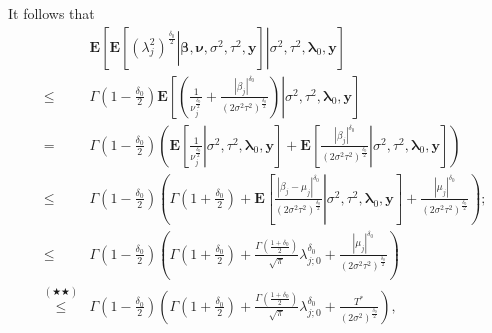 \documentclass[noinfoline,11pt]{imsart}
\numberwithin{equation}{section}
\theoremstyle{plain}
\newcommand{\bl}{\boldsymbol{\lambda}}
\newcommand{\E}{\boldsymbol{E}}
\begin{document}
It follows that 
\begin{eqnarray*}
& &    \E\left[\left.\E\left[\left.\left(\lambda_j^2\right)^{\frac{\delta_0}{2}}\right|\boldsymbol{\beta,\nu},\sigma^2,\tau^2,\mathbf{y}\right]\right|\sigma^2,\tau^2,\mathbf{\bl}_0,\mathbf{y}\right] \\
&\leq& \Gamma\left(1-\frac{\delta_0}{2}\right)\E\left[\left.\left(\frac{1}{\nu_j^{\frac{\delta_0}{2}}}+\frac{\left|\beta_j\right|^{\delta_0}}{\left(2\sigma^2\tau^2\right)^{\frac{\delta_0}{2}}}\right)\right|\sigma^2,\tau^2,\mathbf{\bl}_0,\mathbf{y}\right] \nonumber\\
     &=& \Gamma\left(1-\frac{\delta_0}{2}\right)\left(\E\left[\left.\frac{1}{\nu_j^{\frac{\delta_0}{2}}}\right|\sigma^2,\tau^2,\mathbf{\bl}_0,\mathbf{y}\right]+\E\left[\left.\frac{\left|\beta_j\right|^{\delta_0}}{\left(2\sigma^2\tau^2\right)^{\frac{\delta_0}{2}}}\right|\sigma^2,\tau^2,\mathbf{\bl}_0,\mathbf{y}\right]\right) \nonumber\\
     &\leq& \Gamma\left(1-\frac{\delta_0}{2}\right)\left(\Gamma\left(1+\frac{\delta_0}{2}\right)+\E\left[\left.\frac{\left|\beta_j-\mu_j\right|^{\delta_0}}{\left(2\sigma^2\tau^2\right)^{\frac{\delta_0}{2}}}\right|\sigma^2,\tau^2,\mathbf{\bl}_0,\mathbf{y}\right]+\frac{\left|\mu_j\right|^{\delta_0}}{\left(2\sigma^2\tau^2\right)^{\frac{\delta_0}{2}}}\right); \nonumber \\
     &\leq& \Gamma\left(1-\frac{\delta_0}{2}\right)\left(\Gamma\left(1+\frac{\delta_0}{2}\right)+\frac{\Gamma\left(\frac{1+\delta_0}{2}\right)}{\sqrt{\pi}}\lambda_{j;0}^{\delta_0}+\frac{\left|\mu_j\right|^{\delta_0}}{\left(2\sigma^2\tau^2\right)^{\frac{\delta_0}{2}}}\right) \nonumber \\
     &\overset{(\bigstar\bigstar)}{\leq}&\Gamma\left(1-\frac{\delta_0}{2}\right)\left(\Gamma\left(1+\frac{\delta_0}{2}\right)+\frac{\Gamma\left(\frac{1+\delta_0}{2}\right)}{\sqrt{\pi}}\lambda_{j;0}^{\delta_0}+\frac{T^*}{\left(2\sigma^2\right)^{\frac{\delta_0}{2}}}\right), 
\end{eqnarray*}
\end{document}
